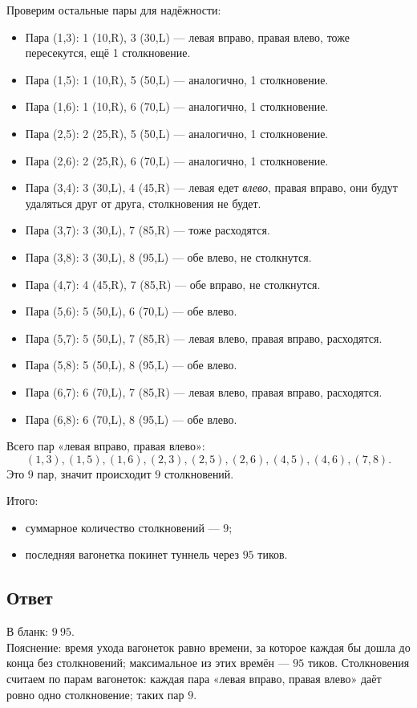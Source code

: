 \documentclass[12pt,a4paper]{article}
\begin{document}
Проверим остальные пары для надёжности:
\begin{itemize}
  \item Пара (1,3): 1 (10,R), 3 (30,L) --- левая вправо, правая влево, тоже пересекутся, ещё 1 столкновение.
  \item Пара (1,5): 1 (10,R), 5 (50,L) --- аналогично, 1 столкновение.
  \item Пара (1,6): 1 (10,R), 6 (70,L) --- аналогично, 1 столкновение.
  \item Пара (2,5): 2 (25,R), 5 (50,L) --- аналогично, 1 столкновение.
  \item Пара (2,6): 2 (25,R), 6 (70,L) --- аналогично, 1 столкновение.
  \item Пара (3,4): 3 (30,L), 4 (45,R) --- левая едет \emph{влево}, правая вправо, они будут удаляться друг от друга, столкновения не будет.
  \item Пара (3,7): 3 (30,L), 7 (85,R) --- тоже расходятся.
  \item Пара (3,8): 3 (30,L), 8 (95,L) --- обе влево, не столкнутся.
  \item Пара (4,7): 4 (45,R), 7 (85,R) --- обе вправо, не столкнутся.
  \item Пара (5,6): 5 (50,L), 6 (70,L) --- обе влево.
  \item Пара (5,7): 5 (50,L), 7 (85,R) --- левая влево, правая вправо, расходятся.
  \item Пара (5,8): 5 (50,L), 8 (95,L) --- обе влево.
  \item Пара (6,7): 6 (70,L), 7 (85,R) --- левая влево, правая вправо, расходятся.
  \item Пара (6,8): 6 (70,L), 8 (95,L) --- обе влево.
\end{itemize}

Всего пар «левая вправо, правая влево»:
\[
(1,3), (1,5), (1,6), (2,3), (2,5), (2,6), (4,5), (4,6), (7,8).
\]
Это $9$ пар, значит происходит $9$ столкновений.

Итого:
\begin{itemize}
  \item суммарное количество столкновений --- $9$;
  \item последняя вагонетка покинет туннель через $95$ тиков.
\end{itemize}

\subsection*{Ответ}
В бланк: $9\ 95$.\\
Пояснение: время ухода вагонеток равно времени, за которое каждая бы дошла до конца без столкновений; максимальное из этих времён --- $95$ тиков. Столкновения считаем по парам вагонеток: каждая пара «левая вправо, правая влево» даёт ровно одно столкновение; таких пар $9$.
\end{document}
